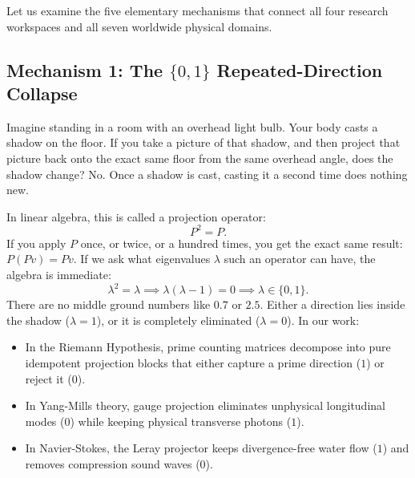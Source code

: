 \documentclass[11pt,a4paper]{article}
\theoremstyle{definition}
\begin{document}
Let us examine the five elementary mechanisms that connect all four research workspaces and all seven worldwide physical domains.

\subsection{Mechanism 1: The $\{0, 1\}$ Repeated-Direction Collapse}
Imagine standing in a room with an overhead light bulb. Your body casts a shadow on the floor. If you take a picture of that shadow, and then project that picture back onto the exact same floor from the same overhead angle, does the shadow change? No. Once a shadow is cast, casting it a second time does nothing new.

In linear algebra, this is called a projection operator:
\begin{equation}
P^2 = P.
\end{equation}
If you apply $P$ once, or twice, or a hundred times, you get the exact same result: $P(P v) = P v$. If we ask what eigenvalues $\lambda$ such an operator can have, the algebra is immediate:
\begin{equation}
\lambda^2 = \lambda \implies \lambda(\lambda - 1) = 0 \implies \lambda \in \{0, 1\}.
\end{equation}
There are no middle ground numbers like $0.7$ or $2.5$. Either a direction lies inside the shadow ($\lambda = 1$), or it is completely eliminated ($\lambda = 0$). In our work:
\begin{itemize}
    \item In the Riemann Hypothesis, prime counting matrices decompose into pure idempotent projection blocks that either capture a prime direction ($1$) or reject it ($0$).
    \item In Yang-Mills theory, gauge projection eliminates unphysical longitudinal modes ($0$) while keeping physical transverse photons ($1$).
    \item In Navier-Stokes, the Leray projector keeps divergence-free water flow ($1$) and removes compression sound waves ($0$).
\end{itemize}
\end{document}
